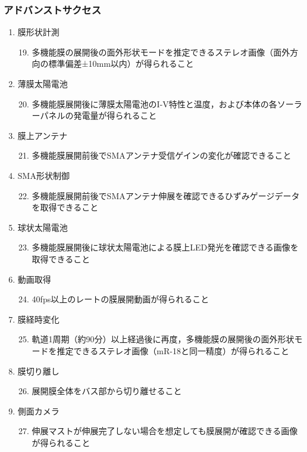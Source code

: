 \subsubsection{アドバンストサクセス}
\begin{enumerate}
	\renewcommand{\labelenumi}{(A\arabic{enumi})}
	\renewcommand{\labelenumii}{(mR-\arabic{enumii})}
	\item 膜形状計測
\begin{enumerate}	
				\setcounter{enumii}{18}
	\item 多機能膜の展開後の面外形状モードを推定できるステレオ画像（面外方向の標準偏差±10mm以内）が得られること
\end{enumerate}
\item 薄膜太陽電池
\begin{enumerate}	
				\setcounter{enumii}{19}
	\item 多機能膜展開後に薄膜太陽電池のI-V特性と温度，および本体の各ソーラーパネルの発電量が得られること
\end{enumerate}
\item 膜上アンテナ
\begin{enumerate}	
				\setcounter{enumii}{20}
	\item 多機能膜展開前後でSMAアンテナ受信ゲインの変化が確認できること
\end{enumerate}
\item SMA形状制御
\begin{enumerate}	
				\setcounter{enumii}{21}
	\item 多機能膜展開前後でSMAアンテナ伸展を確認できるひずみゲージデータを取得できること
\end{enumerate}
\item 球状太陽電池
\begin{enumerate}	
				\setcounter{enumii}{22}
	\item 多機能膜展開後に球状太陽電池による膜上LED発光を確認できる画像を取得できること
\end{enumerate}
\item 動画取得
\begin{enumerate}	
				\setcounter{enumii}{23}
	\item 40fps以上のレートの膜展開動画が得られること
\end{enumerate}
\item 膜経時変化
\begin{enumerate}	
				\setcounter{enumii}{24}
	\item 軌道1周期（約90分）以上経過後に再度，多機能膜の展開後の面外形状モードを推定できるステレオ画像（mR-18と同一精度）が得られること
\end{enumerate}
\item 膜切り離し
\begin{enumerate}	
				\setcounter{enumii}{25}
	\item 展開膜全体をバス部から切り離せること
\end{enumerate}
\item 側面カメラ
\begin{enumerate}	
				\setcounter{enumii}{26}
	\item 伸展マストが伸展完了しない場合を想定しても膜展開が確認できる画像が得られること
\end{enumerate}
\end{enumerate}



